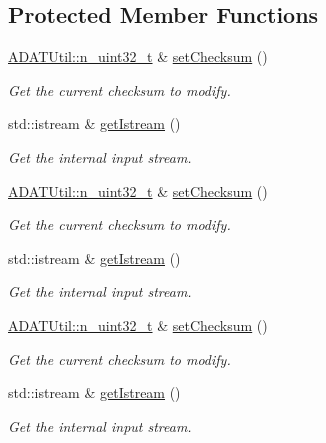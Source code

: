 \subsection*{Protected Member Functions}
\begin{DoxyCompactItemize}
\item 
\mbox{\hyperlink{namespaceADATUtil_ad945a8afa4db2d1f89b731964adae97e}{A\+D\+A\+T\+Util\+::n\+\_\+uint32\+\_\+t}} \& \mbox{\hyperlink{classADATIO_1_1BinaryBufferReader_a3976e5ece3392d04158307f864a84bb7}{set\+Checksum}} ()
\begin{DoxyCompactList}\small\item\em Get the current checksum to modify. \end{DoxyCompactList}\item 
std\+::istream \& \mbox{\hyperlink{classADATIO_1_1BinaryBufferReader_a32d746446a4c990f3c592a32753d7207}{get\+Istream}} ()
\begin{DoxyCompactList}\small\item\em Get the internal input stream. \end{DoxyCompactList}\item 
\mbox{\hyperlink{namespaceADATUtil_ad945a8afa4db2d1f89b731964adae97e}{A\+D\+A\+T\+Util\+::n\+\_\+uint32\+\_\+t}} \& \mbox{\hyperlink{classADATIO_1_1BinaryBufferReader_a3976e5ece3392d04158307f864a84bb7}{set\+Checksum}} ()
\begin{DoxyCompactList}\small\item\em Get the current checksum to modify. \end{DoxyCompactList}\item 
std\+::istream \& \mbox{\hyperlink{classADATIO_1_1BinaryBufferReader_a32d746446a4c990f3c592a32753d7207}{get\+Istream}} ()
\begin{DoxyCompactList}\small\item\em Get the internal input stream. \end{DoxyCompactList}\item 
\mbox{\hyperlink{namespaceADATUtil_ad945a8afa4db2d1f89b731964adae97e}{A\+D\+A\+T\+Util\+::n\+\_\+uint32\+\_\+t}} \& \mbox{\hyperlink{classADATIO_1_1BinaryBufferReader_a3976e5ece3392d04158307f864a84bb7}{set\+Checksum}} ()
\begin{DoxyCompactList}\small\item\em Get the current checksum to modify. \end{DoxyCompactList}\item 
std\+::istream \& \mbox{\hyperlink{classADATIO_1_1BinaryBufferReader_a32d746446a4c990f3c592a32753d7207}{get\+Istream}} ()
\begin{DoxyCompactList}\small\item\em Get the internal input stream. \end{DoxyCompactList}\end{DoxyCompactItemize}


